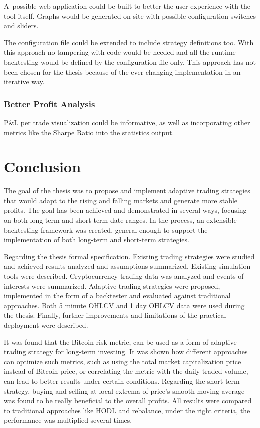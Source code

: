 A~possible web application could be built to better the user experience with the tool itself. Graphs would be generated on-site with possible configuration switches and sliders.

The configuration file could be extended to include strategy definitions too. With this approach no tampering with code would be needed and all the runtime backtesting would be defined by the configuration file only. This approach has not been chosen for the thesis because of the ever-changing implementation in an iterative way.

\subsection*{Better Profit Analysis}
P\&L per trade visualization could be informative, as well as incorporating other metrics like the Sharpe Ratio into the statistics output.

\chapter{Conclusion}
\label{conclusion}
The goal of the thesis was to propose and implement adaptive trading strategies that would adapt to the rising and falling markets and generate more stable profits. The goal has been achieved and demonstrated in several ways, focusing on both long-term and short-term date ranges. In the process, an extensible backtesting framework was created, general enough to support the implementation of both long-term and short-term strategies.

Regarding the thesis formal specification. Existing trading strategies were studied and achieved results analyzed and assumptions summarized. Existing simulation tools were described. Cryptocurrency trading data was analyzed and events of interests were summarized. Adaptive trading strategies were proposed, implemented in the form of a backtester and evaluated against traditional approaches. Both 5 minute OHLCV and 1 day OHLCV data were used during the thesis. Finally, further improvements and limitations of the practical deployment were described.

It was found that the Bitcoin risk metric, can be used as a form of adaptive trading strategy for long-term investing. It was shown how different approaches can optimize such metrics, such as using the total market capitalization price instead of Bitcoin price, or correlating the metric with the daily traded volume, can lead to better results under certain conditions. Regarding the short-term strategy, buying and selling at local extrema of price's smooth moving average was found to be really beneficial to the overall profits. All results were compared to traditional approaches like HODL and rebalance, under the right criteria, the performance was multiplied several times.

